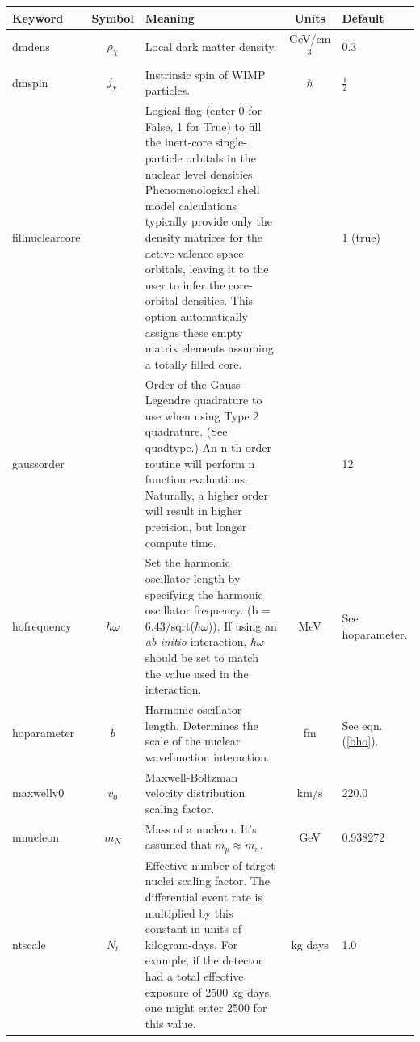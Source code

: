 \documentclass[
14pt, %
a4paper, %
oneside, %
headinclude,footinclude, %
BCOR5mm, %
]{scrartcl}
\begin{document}
\begin{longtable}{| l | c | p{2.5in} | c | l | }
  \hline Keyword & Symbol & Meaning & Units & Default \\

  \hline dmdens & $\rho_\chi$ & Local dark matter density. & GeV/cm$^3$ & 0.3\\

  \hline dmspin & $j_\chi$ & Instrinsic spin of WIMP particles. & $\hbar$ &
  $\frac{1}{2}$ \\

  \hline fillnuclearcore & & Logical flag (enter 0 for False, 1 for True) to fill the
  inert-core single-particle orbitals in the nuclear level densities.
  Phenomenological shell model calculations typically provide only the density
  matrices for the active valence-space orbitals, leaving it to the user to
  infer the core-orbital densities. This option automatically assigns these
  empty matrix elements assuming a totally filled core. & & 1 (true)\\
  
  \hline gaussorder &  & Order of the Gauss-Legendre quadrature to use when using Type 2 quadrature. (See quadtype.) An n-th order routine will perform n function evaluations.  Naturally, a higher order will result in higher precision, but longer compute time. & & 12\\

  \hline hofrequency & $\hbar \omega$ & Set the harmonic oscillator length by
  specifying the harmonic oscillator frequency. (b = 6.43/sqrt($\hbar\omega$)).
  If using an \textit{ab initio} interaction, $\hbar \omega$ should be set to
  match the value used in the interaction.
              & MeV & See hoparameter.\\

  \hline hoparameter & $b$ & Harmonic oscillator length. Determines the scale of the
  nuclear wavefunction interaction. & fm &
  See eqn. (\ref{bho}).  \\

  \hline maxwellv0 & $v_0$ & Maxwell-Boltzman velocity distribution scaling factor. &
  km/s & 220.0 \\

  \hline mnucleon & $m_N$ & Mass of a nucleon. It's assumed that $m_p\approx m_n$. &
  GeV & 0.938272 \\

  \hline ntscale & $N_t$ & Effective number of target nuclei scaling factor. The
  differential event rate is multiplied by this constant in units of
  kilogram-days. For example, if the detector had a total effective exposure of
  2500 kg days, one might enter 2500 for this value. & kg days & 1.0 \\
  

\end{longtable}
\end{document}
